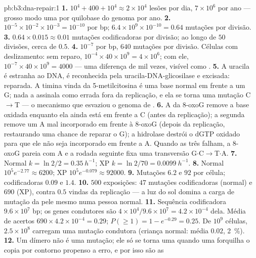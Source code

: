 \begin{solution}{pb:b3:dna-repair:1}
\textbf{1.} $10^{4} + 400 + 10^{4} \approx 2\times 10^{4}$ lesões por
dia, $7\times 10^{6}$ por ano --- grosso modo uma por quilobase do
genoma por ano.
\textbf{2.} $10^{-5}\times 10^{-2}\times 10^{-3} = 10^{-10}$ por bp;
$6.4\times 10^{9}\times 10^{-10} = 0.64$ mutações por divisão.
\textbf{3.} $0.64\times 0.015 \approx 0.01$ mutações codificadoras por
divisão; ao longo de $50$ divisões, cerca de $0.5$.
\textbf{4.} $10^{-7}$ por bp, $640$ mutações por divisão. Células com
deslizamento: sem reparo, $10^{-4}\times 40\times 10^{9} = 4\times 10^{6}$; com ele, $10^{-7}\times 40\times 10^{9} = 4000$ --- uma
diferença de mil vezes, visível como .
\textbf{5.} A uracila é estranha ao DNA, é reconhecida pela
uracila-DNA-glicosilase e excisada: reparada. A timina vinda da
5-metilcitosina é uma base normal em frente a um G; nada a assinala
como errada fora da replicação, e ela se torna uma mutação C$\to$T ---
o mecanismo que esvaziou o genoma de .
\textbf{6.} A  da 8-oxoG remove a base oxidada enquanto ela
ainda está em frente a C (antes da replicação); a segunda 
remove um A mal incorporado em frente à 8-oxoG (depois da replicação,
restaurando uma chance de reparar o G); a hidrolase destrói o dGTP
oxidado para que ele não seja incorporado em frente a A. Quando as três
falham, a 8-oxoG pareia com A e a rodada seguinte fixa uma transversão
G$\cdot$C$\to$T$\cdot$A.
\textbf{7.} Normal $k = \ln 2/2 = \qty{0.35}{h^{-1}}$; XP $k = \ln 2/70
= \qty{0.0099}{h^{-1}}$.
\textbf{8.} Normal $10^{5} e^{-2.77} \approx 6200$; XP $10^{5}
e^{-0.079} \approx \num{92000}$.
\textbf{9.} Mutações $6.2$ e $92$ por célula; codificadoras $0.09$ e
$1.4$.
\textbf{10.} $500$ exposições: $47$ mutações codificadoras (normal) e
$690$ (XP), contra $0.5$ vindas da replicação --- a luz do sol domina a
carga de mutação da pele mesmo numa pessoa normal.
\textbf{11.} Sequência codificadora $9.6\times 10^{7}$ bp; os genes
condutores são $4\times 10^{4}/9.6\times 10^{7} = 4.2\times 10^{-4}$
dela. Média de acertos $690\times 4.2\times 10^{-4} = 0.29$;
$P(\ge 1) = 1 - e^{-0.29} =
0.25$. De $10^{9}$ células, $2.5\times 10^{8}$ carregam uma mutação condutora (criança normal: média $0.02$,
\qty{2}{\%}).
\textbf{12.} Um dímero não é uma mutação; ele só se torna uma quando
uma forquilha o copia por contorno propenso a erro, e por isso são as

\end{solution}
